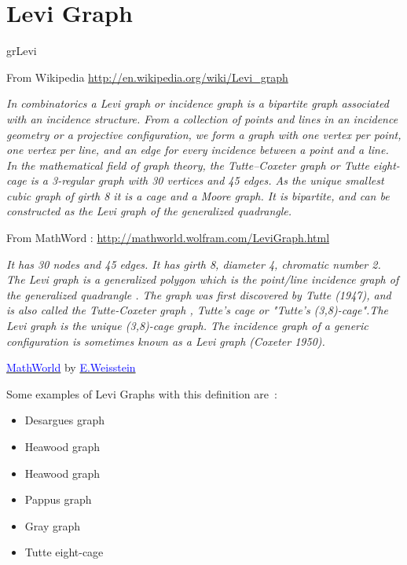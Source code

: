 \newpage\section{Levi Graph}\label{levi}
\begin{NewMacroBox}{grLevi}{}

\medskip

From Wikipedia \url{http://en.wikipedia.org/wiki/Levi_graph}

\emph{In combinatorics a Levi graph or incidence graph is a bipartite graph associated with an incidence structure. From a collection of points and lines in an incidence geometry or a projective configuration, we form a graph with one vertex per point, one vertex per line, and an edge for every incidence between a point and a line.\hfil\break 
In the mathematical field of graph theory, the Tutte–Coxeter graph or Tutte eight-cage is a 3-regular graph with 30 vertices and 45 edges. As the unique smallest cubic graph of girth 8 it is a cage and a Moore graph. It is bipartite, and can be constructed as the Levi graph of the generalized quadrangle. }

From MathWord : \url{http://mathworld.wolfram.com/LeviGraph.html} 

\emph{It has 30 nodes and 45 edges. It has girth 8, diameter 4, chromatic number 2. The Levi graph is a generalized polygon which is the point/line incidence graph of the generalized quadrangle . The graph  was first discovered by Tutte (1947), and is also called the Tutte-Coxeter graph , Tutte's cage  or "Tutte's (3,8)-cage".The Levi graph is the unique (3,8)-cage graph.\hfil\break
The incidence graph of a generic configuration is sometimes known as a Levi graph (Coxeter 1950).} 

\href{http://mathworld.wolfram.com/topics/GraphTheory.html}%
           {\textcolor{blue}{MathWorld}} by \href{http://en.wikipedia.org/wiki/Eric_W._Weisstein}%
           {\textcolor{blue}{E.Weisstein}}   
           
Some examples of Levi Graphs with this definition are~: 
\begin{itemize}
\item Desargues graph
\item Heawood graph
\item Heawood graph
\item Pappus graph
\item Gray graph 
\item Tutte eight-cage 
\end{itemize}

\end{NewMacroBox}

